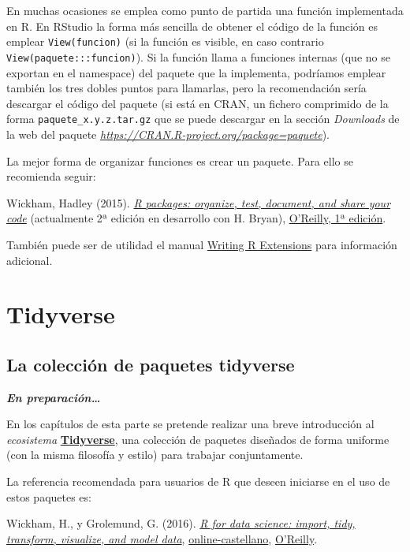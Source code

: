 \documentclass[
]{book}
\theoremstyle{break}
\theoremstyle{nonumberplain}
\begin{document}
En muchas ocasiones se emplea como punto de partida una función implementada en R.
En RStudio la forma más sencilla de obtener el código de la función es emplear \texttt{View(funcion)} (si la función es visible, en caso contrario \texttt{View(paquete:::funcion)}).
Si la función llama a funciones internas (que no se exportan en el namespace) del paquete que la implementa, podríamos emplear también los tres dobles puntos para llamarlas, pero la recomendación sería descargar el código del paquete (si está en CRAN, un fichero comprimido de la forma \texttt{paquete\_x.y.z.tar.gz} que se puede descargar en la sección \emph{Downloads} de la web del paquete \emph{\url{https://CRAN.R-project.org/package=paquete}}).

La mejor forma de organizar funciones es crear un paquete.
Para ello se recomienda seguir:

Wickham, Hadley (2015). \emph{\href{http://r-pkgs.had.co.nz/}{R packages: organize, test, document, and share your code}} (actualmente 2ª edición en desarrollo con H. Bryan), \href{http://shop.oreilly.com/product/0636920034421.do}{O'Reilly, 1ª edición}.

También puede ser de utilidad el manual \href{http://colinfay.me/writing-r-extensions}{Writing R Extensions} para información adicional.

\hypertarget{part-tidyverse}{%
\part{Tidyverse}\label{part-tidyverse}}

\hypertarget{tidyverse}{%
\chapter{La colección de paquetes tidyverse}\label{tidyverse}}

\textbf{\emph{En preparación\ldots{}}}

En los capítulos de esta parte se pretende realizar una breve introducción al \emph{ecosistema} \href{https://dplyr.tidyverse.org}{\textbf{Tidyverse}}, una colección de paquetes diseñados de forma uniforme (con la misma filosofía y estilo) para trabajar conjuntamente.

La referencia recomendada para usuarios de R que deseen iniciarse en el uso de estos paquetes es:

Wickham, H., y Grolemund, G. (2016). \emph{\href{http://r4ds.had.co.nz}{R for data science: import, tidy, transform, visualize, and model data}}, \href{https://es.r4ds.hadley.nz}{online-castellano}, \href{http://shop.oreilly.com/product/0636920034407.do}{O'Reilly}.
\end{document}
